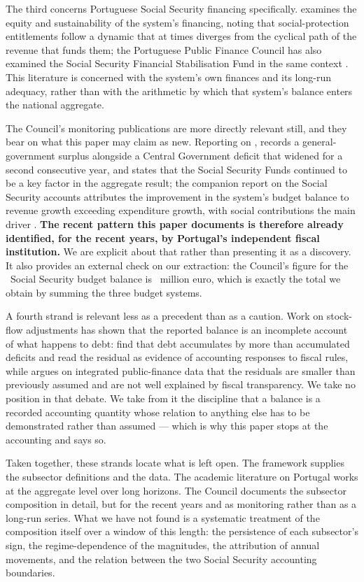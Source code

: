The third concerns Portuguese Social Security financing specifically.
\citet{cardoso2019} examines the equity and sustainability of the system's
financing, noting that social-protection entitlements follow a dynamic that at
times diverges from the cyclical path of the revenue that funds them; the
Portuguese Public Finance Council has also examined the Social Security Financial
Stabilisation Fund in the same context \citep{cfp_fefss}. This literature is
concerned with the system's own finances and its long-run adequacy, rather than
with the arithmetic by which that system's balance enters the national aggregate.

The Council's monitoring publications are more directly relevant still, and they
bear on what this paper may claim as new. Reporting on \LatestYear,
\citet{cfp_outturn2025} records a general-government surplus alongside a Central
Government deficit that widened for a second consecutive year, and states that the
Social Security Funds continued to be a key factor in the aggregate result; the
companion report on the Social Security accounts attributes the improvement in the
system's budget balance to revenue growth exceeding expenditure growth, with social
contributions the main driver \citep{cfp_ss_outturn2025}. \textbf{The recent pattern
this paper documents is therefore already identified, for the recent years, by
Portugal's independent fiscal institution.} We are explicit about that rather than
presenting it as a discovery. It also provides an external check on our extraction:
the Council's figure for the \LatestYear\ Social Security budget balance is
\SsfBudgetLatest\ million euro, which is exactly the total we obtain by summing the
three budget systems.

A fourth strand is relevant less as a precedent than as a caution. Work on
stock-flow adjustments has shown that the reported balance is an incomplete account
of what happens to debt: \citet{vonhagen2006} find that debt accumulates by more
than accumulated deficits and read the residual as evidence of accounting responses
to fiscal rules, while \citet{seiferling2013} argues on integrated public-finance
data that the residuals are smaller than previously assumed and are not well
explained by fiscal transparency. We take no position in that debate. We take from
it the discipline that a balance is a recorded accounting quantity whose relation
to anything else has to be demonstrated rather than assumed --- which is why this
paper stops at the accounting and says so.

Taken together, these strands locate what is left open. The framework supplies the
subsector definitions and the data. The academic literature on Portugal works at the
aggregate level over long horizons. The Council documents the subsector composition
in detail, but for the recent years and as monitoring rather than as a long-run
series. What we have not found is a systematic treatment of the composition itself
over a window of this length: the persistence of each subsector's sign, the
regime-dependence of the magnitudes, the attribution of annual movements, and the
relation between the two Social Security accounting boundaries.

